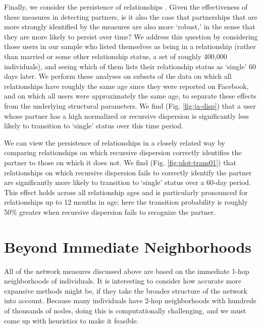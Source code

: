 \documentclass{sigchi}
\newcommand{\omt}[1]{}
\begin{document}
Finally, we consider the persistence of relationships
\cite{le-rel-dissolution}.
Given the effectiveness of these measures in detecting
partners, is it also the case that partnerships that are more strongly
identified by the measures are also more `robust,'
in the sense that they are more likely to persist over time?
We address this question by considering those users in our sample who listed
themselves as being in a relationship (rather than married or
some other relationship status, a set of roughly 400,000 individuals), 
and seeing which of them
lists their relationship status as `single' 60 days later.
We perform these analyses on subsets of the data on which all
relationships have roughly the same age since they were reported
on Facebook, and on which all users were approximately the same age,
to separate these effects from the underlying structural parameters.
We find (Fig. \ref{fig:ja-disp}) that a user whose partner has a
high normalized or recursive dispersion is significantly less
likely to transition to `single' status over this time period.

We can view the persistence of relationships
in a closely related way by comparing relationships on which 
recursive dispersion correctly identifies the partner to 
those on which it does not.
We find (Fig. \ref{fig:plot-trans01}) that relationships on which
recursive dispersion fails to correctly identify the partner 
are significantly more likely to transition to `single' status over
a 60-day period. 
This effect holds across all relationship ages and
is particularly pronounced 
for relationships up to 12 months in age;
here the transition probability is roughly 50\% greater
when recursive dispersion fails to recognize the partner.







\newcommand{\mhdr}[1]{\paragraph*{\bf #1.}}

\section{Beyond Immediate Neighborhoods}
All of the network measures discussed above are based on the immediate
1-hop neighborhoods of individuals. It is interesting to consider how 
accurate more expansive methods might be, if they take
the broader structure of the network into account.  
Because many individuals have 2-hop neighborhoods with hundreds
of thousands of nodes, doing this is computationally
challenging, and we must come up with heuristics to make it 
feasible.
\end{document}
